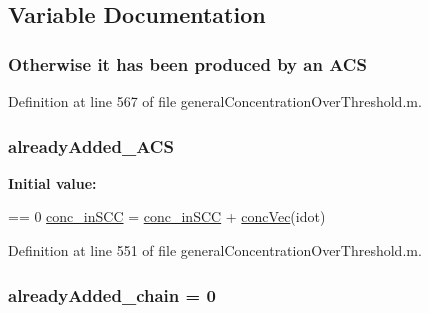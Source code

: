 \subsection{Variable Documentation}
\hypertarget{a00028_ad72e1068795c577213481e5db7f3e925}{
\subsubsection[{A\-C\-S}]{ Otherwise it has been produced by an A\-C\-S}}\label{a00028_ad72e1068795c577213481e5db7f3e925}


Definition at line 567 of file general\-Concentration\-Over\-Threshold.\-m.

\hypertarget{a00028_a77c2cda04a3103708011753a77dceda3}{
\subsubsection[{already\-Added\-\_\-\-A\-C\-S}]{\setlength{\rightskip}{0pt plus 5cm}already\-Added\-\_\-\-A\-C\-S}}\label{a00028_a77c2cda04a3103708011753a77dceda3}
{\bfseries Initial value\-:}
\begin{DoxyCode}
== 0 %
                                                \hyperlink{a00028_a2ac2f79c8327273bba427ba3e8d2cfbe}{conc\_inSCC} = 
      \hyperlink{a00028_a2ac2f79c8327273bba427ba3e8d2cfbe}{conc\_inSCC} + \hyperlink{a00028_a5cb5865443d8f156213280c070385e0d}{concVec}(idot)
\end{DoxyCode}


Definition at line 551 of file general\-Concentration\-Over\-Threshold.\-m.

\hypertarget{a00028_a1ddec545d7ccb86836f79e7f7e9ecb55}{
\subsubsection[{already\-Added\-\_\-chain}]{ already\-Added\-\_\-chain = 0}}\label{a00028_a1ddec545d7ccb86836f79e7f7e9ecb55}


